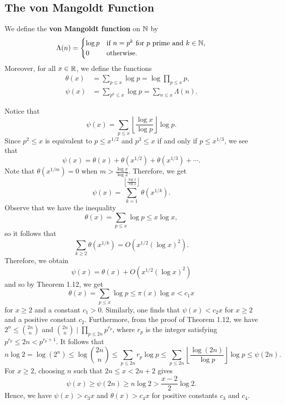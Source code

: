 \subsection{The von Mangoldt Function}

\begin{defn}
We define the {\bf von Mangoldt function} on $\mathbb{N}$ by 
\[ \Lambda(n) = \begin{cases} \log p & \text{if $n = p^k$ for $p$ prime and $k \in \mathbb{N}$,} \\ 0 & \text{otherwise.} \end{cases} \]
Moreover, for all $x \in \mathbb{R}$, we define the functions 
\begin{align*}
    \theta(x) &= \sum_{p\leq x} \log p = \log \prod_{p \leq x} p, \\ 
    \psi(x) &= \sum_{p^k \leq x} \log p = \sum_{n \leq x} \Lambda(n). 
\end{align*}
\end{defn}

Notice that 
\[ \psi(x) = \sum_{p\leq x} \left\lfloor \frac{\log x}{\log p} \right\rfloor \log p. \]
Since $p^2 \leq x$ is equivalent to $p \leq x^{1/2}$ and $p^3 \leq x$ if and only if $p \leq x^{1/3}$, 
we see that 
\[ \psi(x) = \theta(x) + \theta(x^{1/2}) + \theta(x^{1/3}) + \cdots. \]
Note that $\theta(x^{1/m}) = 0$ when $m > \frac{\log x}{\log 2}$. Therefore, we get 
\[ \psi(x) = \sum_{k=1}^{\left\lfloor \frac{\log x}{\log 2} \right\rfloor} \theta(x^{1/k}). \]
Observe that we have the inequality 
\[ \theta(x) = \sum_{p\leq x} \log p \leq x \log x, \]
so it follows that 
\[ \sum_{k \geq 2} \theta(x^{1/k}) = O\left( x^{1/2} (\log x)^2 \right). \]
Therefore, we obtain 
\[ \psi(x) = \theta(x) + O\left( x^{1/2} (\log x)^2 \right) \]
and so by Theorem 1.12, we get 
\[ \theta(x) = \sum_{p\leq x}\log p \leq \pi(x) \log x < c_1 x \]
for $x \geq 2$ and a constant $c_1 > 0$. Similarly, one finds that $\psi(x) < c_2x$ for $x \geq 2$
and a positive constant $c_2$. Furthermore, from the proof of Theorem 1.12, we have $2^n \leq \binom{2n}n$
and $\binom{2n}n \mid \prod_{p \leq 2n} p^{r_p}$, where $r_p$ is the integer satisfying 
$p^{r_p} \leq 2n < p^{r_p+1}$. It follows that 
\[ n\log 2 = \log(2^n) \leq \log \binom{2n}n \leq \sum_{p\leq 2n} r_p \log p \leq 
\sum_{p \leq 2n} \left\lfloor \frac{\log(2n)}{\log p} \right\rfloor \log p \leq \psi(2n). \]
For $x \geq 2$, choosing $n$ such that $2n \leq x < 2n+2$ gives 
\[ \psi(x) \geq \psi(2n) \geq n\log 2 > \frac{x-2}2 \log 2. \]
Hence, we have $\psi(x) > c_3x$ and $\theta(x) > c_4x$ for positive constants $c_3$ and $c_4$. 

